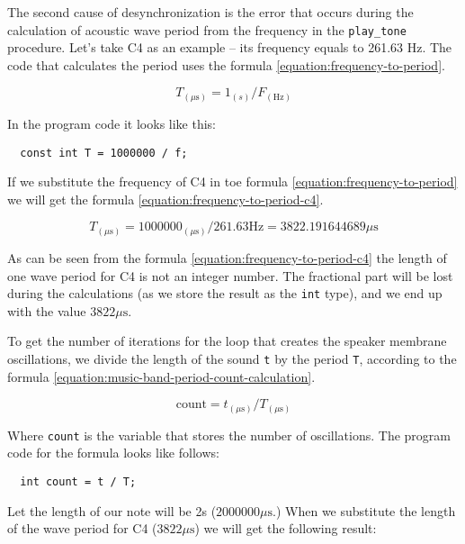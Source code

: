 \documentclass[../sparc.tex]{subfiles}
\begin{document}
The second cause of desynchronization is the error that occurs during the
calculation of acoustic wave period from the frequency in the
\texttt{play\_tone} procedure.  Let's take C4 as an example -- its frequency
equals to 261.63 Hz.  The code that calculates the period uses the formula
\ref{equation:frequency-to-period}.

\begin{equation}
  T_{(\mu\mbox{s})} = 1_{(s)} / F_{(\mbox{Hz})}
  \label{equation:frequency-to-period}
\end{equation}

In the program code it looks like this:

\begin{verbatim}
  const int T = 1000000 / f;
\end{verbatim}

If we substitute the frequency of C4 in toe formula
\ref{equation:frequency-to-period} we will get the formula
\ref{equation:frequency-to-period-c4}.

\begin{equation}
  T_{(\mu\mbox{s})} = 1000000_{(\mu\mbox{s})} / 261.63 \mbox{Hz} = 3822.191644689 \mu\mbox{s}
  \label{equation:frequency-to-period-c4}
\end{equation}

As can be seen from the formula \ref{equation:frequency-to-period-c4} the length
of one wave period for C4 is not an integer number.  The fractional part will be
lost during the calculations (as we store the result as the \texttt{int} type),
and we end up with the value $3822 \mu\mbox{s}$.

To get the number of iterations for the loop that creates the speaker membrane
oscillations, we divide the length of the sound \texttt{t} by the period
\texttt{T}, according to the formula
\ref{equation:music-band-period-count-calculation}.

\begin{equation}
  \mbox{count} = t_{(\mu\mbox{s})} / T_{(\mu\mbox{s})}
  \label{equation:music-band-period-count-calculation}
\end{equation}

Where \texttt{count} is the variable that stores the number of oscillations.
The program code for the formula looks like follows:

\begin{verbatim}
  int count = t / T;
\end{verbatim}

Let the length of our note will be 2s ($2000000 \mu\mbox{s}$.)  When we substitute
the length of the wave period for C4 ($3822 \mu\mbox{s}$) we will get the
following result:
\end{document}
